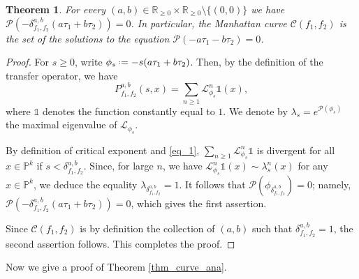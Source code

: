 \documentclass[11pt]{amsart}
\theoremstyle{plain}
\newtheorem{thm}{Theorem}[section]
\theoremstyle{definition}
\theoremstyle{remark}
\newcommand*{\defeq}{\mathrel{\vcenter{\baselineskip0.5ex \lineskiplimit0pt
			\hbox{\scriptsize.}\hbox{\scriptsize.}}}%
	=}
\begin{document}
\begin{thm}\label{thm_Bowen}
For every
$(a,b)\in\mathbb{R}_{\ge 0} \times \mathbb{R}_{\ge 0} \setminus \{(0,0)\}$
we have
$\mathcal{P}(-\delta^{a,b}_{f_1,f_2}(a\tau_1 +b\tau_2))=0$. In particular, the Manhattan curve $\mathcal{C}(f_1,f_2)$ is the set of the solutions to the equation
$\mathcal{P}(-a\tau_1-b\tau_2)=0$.
\end{thm}
\begin{proof}
For $s \ge 0$, write $\phi_s \defeq -s(a\tau_1+b\tau_2)$.
Then,
by the definition of
the transfer operator,
we have
\begin{equation}\label{eq_1}
P_{f_1,f_2}^{a,b}(s,x) = \sum_{n\ge 1} \mathcal{L}^n_{\phi_s}\mathds{1}(x),
\end{equation}
where $\mathds{1}$ denotes the function constantly equal to $1$.
We denote by $\lambda_s=e^{\mathcal{P}(\phi_s)}$ the maximal
eigenvalue of $\mathcal{L}_{\phi_s}$.

By definition of critical exponent and \eqref{eq_1}, 
$\sum_{n\ge 1} \mathcal{L}^n_{\phi_s}\mathds{1}$ 
is divergent for all $x \in \mathbb{P}^k$ if $s < \delta_{f_1,f_2}^{a,b}$. Since,
for large $n$,  we have
$\mathcal{L}^n_{\phi_s}\mathds{1}(x) \sim \lambda_s^n(x)$ for any $x\in \mathbb{P}^k$, we 
deduce the equality
$\lambda_{\delta_{f_1,f_2}^{a,b}} = 1$. 
It follows that $\mathcal{P}(\phi_{\delta_{f_1,f_2}^{a,b}}) = 0$; namely, $\mathcal{P}(-\delta_{f_1,f_2}^{a,b}(a\tau_1+b\tau_2)) = 0$, which gives the first assertion. 

Since $\mathcal{C}(f_1,f_2)$ is by definition the collection of $(a,b)$ such that $\delta_{f_1,f_2}^{a,b}=1$, the second assertion follows.
This completes the proof.
\end{proof}

Now we give a proof of Theorem \ref{thm_curve_ana}.
\end{document}
